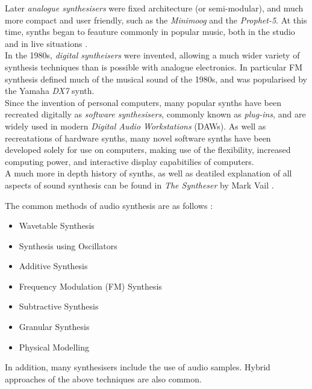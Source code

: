 \documentclass[11pt, oneside]{report}   	%
\begin{document}
Later \emph{analogue synthesisers} were fixed architecture (or semi-modular), and much more compact and user friendly, such as the \emph{Minimoog} and the \emph{Prophet-5}. At this time, synths began to feauture commonly in popular music, both in the studio and in live situations \cite{Synth}.\\
In the 1980s, \emph{digital syntheisers} were invented, allowing a much wider variety of synthesis techniques than is possible with analogue electronics. In particular FM synthesis defined much of the musical sound of the 1980s, and was popularised by the Yamaha \emph{DX7} synth.\\
Since the invention of personal computers, many popular synths have been recreated digitally as \emph{software synthesisers}, commonly known as \emph{plug-ins}, and are widely used in modern \emph{Digital Audio Workstations} (DAWs). As well as recreatations of hardware synths, many novel software synths have been developed solely for use on computers, making use of the flexibility, increased computing power, and interactive display capabitilies of computers.\\
A much more in depth history of synths, as well as deatiled explanation of all aspects of sound synthesis can be found in \emph{The Syntheser} by Mark Vail \cite{Synth}.

The common methods of audio synthesis are as follows \cite{SynthTypes}:
\begin{itemize}
	\vspace{-10pt}
	\setlength\itemsep{-1.2em}
	\item Wavetable Synthesis
	\item Synthesis using Oscillators
	\item Additive Synthesis
	\item Frequency Modulation (FM) Synthesis
	\item Subtractive Synthesis
	\item Granular Synthesis
	\item Physical Modelling
		\vspace{-10pt}
\end{itemize}
In addition, many synthesisers include the use of audio samples. Hybrid approaches of the above techniques are also common.
\end{document}
